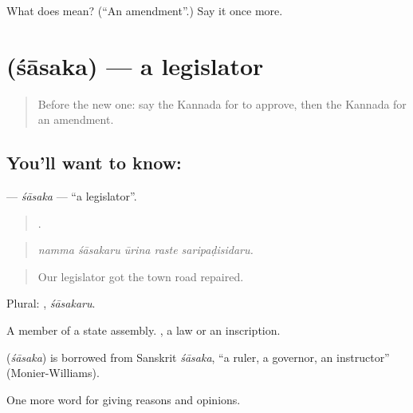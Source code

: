 \begin{tcolorbox}[breakable,colback=teal!4,colframe=teal!35!black,title={Before you move on}]
What does  mean? (\textquotedblleft{}An amendment\textquotedblright{}.) Say it once more.
\end{tcolorbox}
\section[\texorpdfstring{\kn{ಶಾಸಕ} (śāsaka)}{ಶಾಸಕ (śāsaka)}]{ (śāsaka) — a legislator}

\label{lesson:KA-C396-sasaka}



\begin{quote}
Before the new one: say the Kannada for to approve, then the Kannada for an amendment.
\end{quote}

\subsection*{You'll want to know: }
\textbf{} — \emph{śāsaka} — \textquotedblleft{}a legislator\textquotedblright{}.

\begin{quote}
    .
\end{quote}

\begin{quote}
\emph{namma śāsakaru ūrina raste saripaḍisidaru.}
\end{quote}

\begin{quote}
Our legislator got the town road repaired.
\end{quote}

Plural: , \emph{śāsakaru}.

A member of a state assembly. , a law or an inscription.

\begin{cousinweb}
\textbf{} (\emph{śāsaka}) is borrowed from Sanskrit \emph{śāsaka}, \textquotedblleft{}a ruler, a governor, an instructor\textquotedblright{} (Monier-Williams).
\end{cousinweb}

\begin{grammarlens}[title={What you've built}]
One more word for giving reasons and opinions.
\end{grammarlens}

